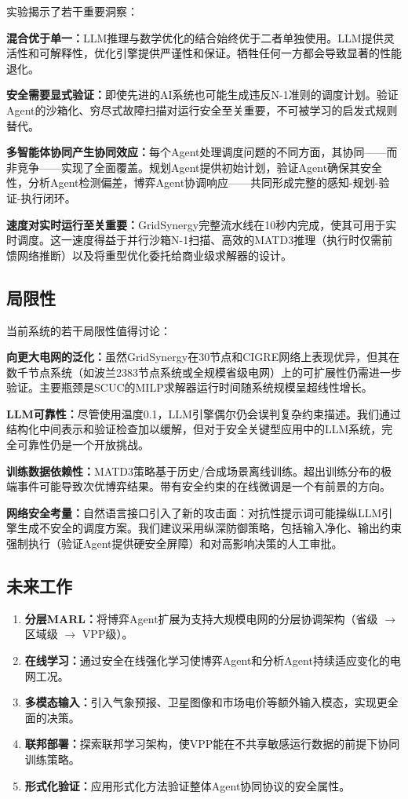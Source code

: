\documentclass[conference]{IEEEtran}
\begin{document}
实验揭示了若干重要洞察：

\textbf{混合优于单一：}LLM推理与数学优化的结合始终优于二者单独使用。LLM提供灵活性和可解释性，优化引擎提供严谨性和保证。牺牲任何一方都会导致显著的性能退化。

\textbf{安全需要显式验证：}即使先进的AI系统也可能生成违反N-1准则的调度计划。验证Agent的沙箱化、穷尽式故障扫描对运行安全至关重要，不可被学习的启发式规则替代。

\textbf{多智能体协同产生协同效应：}每个Agent处理调度问题的不同方面，其协同——而非竞争——实现了全面覆盖。规划Agent提供初始计划，验证Agent确保其安全性，分析Agent检测偏差，博弈Agent协调响应——共同形成完整的感知-规划-验证-执行闭环。

\textbf{速度对实时运行至关重要：}GridSynergy完整流水线在10秒内完成，使其可用于实时调度。这一速度得益于并行沙箱N-1扫描、高效的MATD3推理（执行时仅需前馈网络推断）以及将重型优化委托给商业级求解器的设计。

\subsection{局限性}

当前系统的若干局限性值得讨论：

\textbf{向更大电网的泛化：}虽然GridSynergy在30节点和CIGRE网络上表现优异，但其在数千节点系统（如波兰2383节点系统或全规模省级电网）上的可扩展性仍需进一步验证。主要瓶颈是SCUC的MILP求解器运行时间随系统规模呈超线性增长。

\textbf{LLM可靠性：}尽管使用温度0.1，LLM引擎偶尔仍会误判复杂约束描述。我们通过结构化中间表示和验证检查加以缓解，但对于安全关键型应用中的LLM系统，完全可靠性仍是一个开放挑战。

\textbf{训练数据依赖性：}MATD3策略基于历史/合成场景离线训练。超出训练分布的极端事件可能导致次优博弈结果。带有安全约束的在线微调是一个有前景的方向。

\textbf{网络安全考量：}自然语言接口引入了新的攻击面：对抗性提示词可能操纵LLM引擎生成不安全的调度方案。我们建议采用纵深防御策略，包括输入净化、输出约束强制执行（验证Agent提供硬安全屏障）和对高影响决策的人工审批。

\subsection{未来工作}

\begin{enumerate}
    \item \textbf{分层MARL：}将博弈Agent扩展为支持大规模电网的分层协调架构（省级 $\to$ 区域级 $\to$ VPP级）。
    \item \textbf{在线学习：}通过安全在线强化学习使博弈Agent和分析Agent持续适应变化的电网工况。
    \item \textbf{多模态输入：}引入气象预报、卫星图像和市场电价等额外输入模态，实现更全面的决策。
    \item \textbf{联邦部署：}探索联邦学习架构，使VPP能在不共享敏感运行数据的前提下协同训练策略。
    \item \textbf{形式化验证：}应用形式化方法验证整体Agent协同协议的安全属性。
\end{enumerate}
\end{document}
